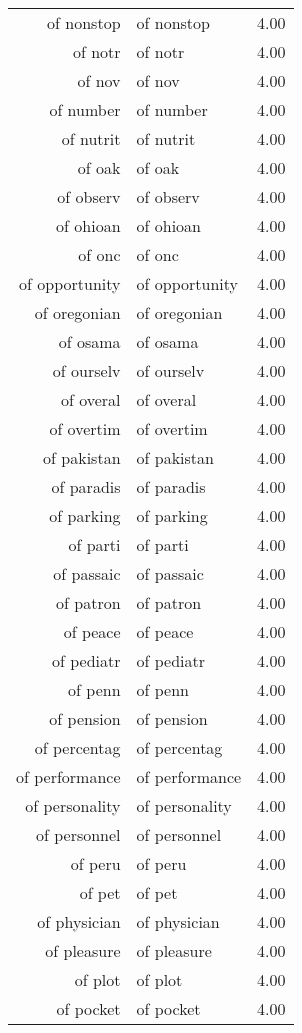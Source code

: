 \begin{table}[ht]
\begin{tabular}{rlr}
  of nonstop & of nonstop & 4.00 \\ 
  of notr & of notr & 4.00 \\ 
  of nov & of nov & 4.00 \\ 
  of number & of number & 4.00 \\ 
  of nutrit & of nutrit & 4.00 \\ 
  of oak & of oak & 4.00 \\ 
  of observ & of observ & 4.00 \\ 
  of ohioan & of ohioan & 4.00 \\ 
  of onc & of onc & 4.00 \\ 
  of opportunity & of opportunity & 4.00 \\ 
  of oregonian & of oregonian & 4.00 \\ 
  of osama & of osama & 4.00 \\ 
  of ourselv & of ourselv & 4.00 \\ 
  of overal & of overal & 4.00 \\ 
  of overtim & of overtim & 4.00 \\ 
  of pakistan & of pakistan & 4.00 \\ 
  of paradis & of paradis & 4.00 \\ 
  of parking & of parking & 4.00 \\ 
  of parti & of parti & 4.00 \\ 
  of passaic & of passaic & 4.00 \\ 
  of patron & of patron & 4.00 \\ 
  of peace & of peace & 4.00 \\ 
  of pediatr & of pediatr & 4.00 \\ 
  of penn & of penn & 4.00 \\ 
  of pension & of pension & 4.00 \\ 
  of percentag & of percentag & 4.00 \\ 
  of performance & of performance & 4.00 \\ 
  of personality & of personality & 4.00 \\ 
  of personnel & of personnel & 4.00 \\ 
  of peru & of peru & 4.00 \\ 
  of pet & of pet & 4.00 \\ 
  of physician & of physician & 4.00 \\ 
  of pleasure & of pleasure & 4.00 \\ 
  of plot & of plot & 4.00 \\ 
  of pocket & of pocket & 4.00 \\ 

\end{tabular}
\end{table}
